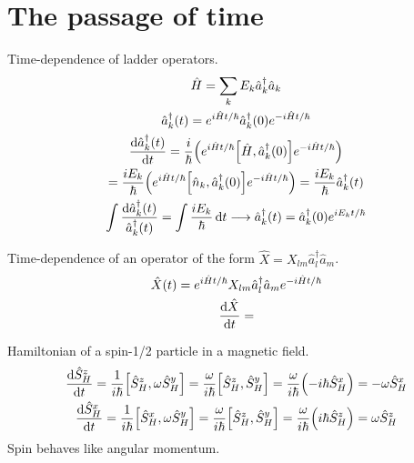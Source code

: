 \documentclass{report}
\begin{document}
\chapter{The passage of time}

\begin{subquests}
	\item

	\item Time-dependence of ladder operators.
	\begin{gather*}
		\hat{H} = \sum_k E_k \hat{a}_k^\dagger \hat{a}_k \\
		\hat{a}^{\dagger}_{k}(t) = e^{i\hat{H}t/\hbar}\hat{a}^{\dagger}_{k}(0)e^{-i\hat{H}t/\hbar} \\
		\dv{\hat{a}^{\dagger}_{k}(t)}{t} = \frac{i}{\hbar}\pqty{e^{i\hat{H}t/\hbar}\bqty{\hat{H},\hat{a}^{\dagger}_{k}(0)}e^{-i\hat{H}t/\hbar}} \\
		= \frac{iE_k}{\hbar}\pqty{e^{i\hat{H}t/\hbar}\bqty{\hat{n}_k,\hat{a}^{\dagger}_{k}(0)}e^{-i\hat{H}t/\hbar}} = \frac{iE_k}{\hbar}\hat{a}^{\dagger}_{k}(t) \\
		\int \frac{\dd{\hat{a}^{\dagger}_{k}(t)}}{\hat{a}^{\dagger}_{k}(t)} = \int \frac{iE_k}{\hbar}\dd{t} \longrightarrow \hat{a}^{\dagger}_{k}(t) = \hat{a}^{\dagger}_{k}(0)e^{iE_kt/\hbar}
	\end{gather*}

	\item Time-dependence of an operator of the form $\hat X = X_{lm} \hat{a}^{\dagger}_l \hat{a}_m$.
	\begin{gather*}
		\hat{X}(t) = e^{i\hat{H}t/\hbar}X_{lm}\hat{a}^{\dagger}_l \hat{a}_m e^{-i\hat{H}t/\hbar} \\
		\dv{\hat{X}}{t} = 
	\end{gather*}

	\item Hamiltonian of a spin-1/2 particle in a magnetic field.
	\begin{gather*}
		\dv{\hat{S}^z_H}{t} = \frac{1}{i\hbar}\bqty{\hat{S}^z_H,\omega\hat{S}^y_H} = \frac{\omega}{i\hbar}\bqty{\hat{S}^z_H,\hat{S}^y_H} = \frac{\omega}{i\hbar}\pqty{-i\hbar\hat{S}^x_H} = -\omega\hat{S}^x_H \\
		\dv{\hat{S}^x_H}{t} = \frac{1}{i\hbar}\bqty{\hat{S}^x_H,\omega\hat{S}^y_H} = \frac{\omega}{i\hbar}\bqty{\hat{S}^z_H,\hat{S}^y_H} = \frac{\omega}{i\hbar}\pqty{i\hbar\hat{S}^z_H} = \omega\hat{S}^z_H 
	\end{gather*}
	Spin behaves like angular momentum.
\end{subquests}
\end{document}
